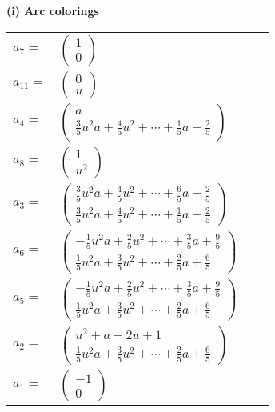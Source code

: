 \documentclass[1p]{elsarticle_modified}
\theoremstyle{definition}
\begin{document}
\flushleft \textbf{(i) Arc colorings}\\
\begin{tabular}{m{7pt} m{180pt} m{7pt} m{180pt} }
\flushright $a_{7}=$&$\begin{pmatrix}1\\0\end{pmatrix}$ \\
\flushright $a_{11}=$&$\begin{pmatrix}0\\u\end{pmatrix}$ \\
\flushright $a_{4}=$&$\begin{pmatrix}a\\\frac{3}{5} u^2 a+\frac{4}{5} u^2+\cdots+\frac{1}{5} a-\frac{2}{5}\end{pmatrix}$ \\
\flushright $a_{8}=$&$\begin{pmatrix}1\\u^2\end{pmatrix}$ \\
\flushright $a_{3}=$&$\begin{pmatrix}\frac{3}{5} u^2 a+\frac{4}{5} u^2+\cdots+\frac{6}{5} a-\frac{2}{5}\\\frac{3}{5} u^2 a+\frac{4}{5} u^2+\cdots+\frac{1}{5} a-\frac{2}{5}\end{pmatrix}$ \\
\flushright $a_{6}=$&$\begin{pmatrix}-\frac{1}{5} u^2 a+\frac{2}{5} u^2+\cdots+\frac{3}{5} a+\frac{9}{5}\\\frac{1}{5} u^2 a+\frac{3}{5} u^2+\cdots+\frac{2}{5} a+\frac{6}{5}\end{pmatrix}$ \\
\flushright $a_{5}=$&$\begin{pmatrix}-\frac{1}{5} u^2 a+\frac{2}{5} u^2+\cdots+\frac{3}{5} a+\frac{9}{5}\\\frac{1}{5} u^2 a+\frac{3}{5} u^2+\cdots+\frac{2}{5} a+\frac{6}{5}\end{pmatrix}$ \\
\flushright $a_{2}=$&$\begin{pmatrix}u^2+a+2 u+1\\\frac{1}{5} u^2 a+\frac{3}{5} u^2+\cdots+\frac{2}{5} a+\frac{6}{5}\end{pmatrix}$ \\
\flushright $a_{1}=$&$\begin{pmatrix}-1\\0\end{pmatrix}$ \\

\end{tabular}
\end{document}
